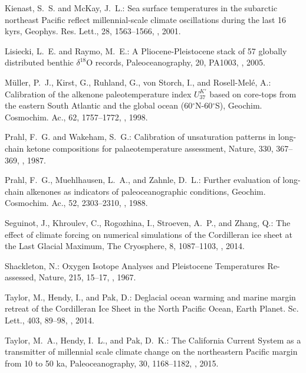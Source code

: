 \begin{thebibliography}{69}
Kienast, S.~S. and McKay, J.~L.: Sea surface temperatures in the subarctic
  northeast Pacific reflect millennial-scale climate oscillations during the
  last 16 kyrs, Geophys. Res. Lett., 28, 1563--1566,
  , 2001.

Lisiecki, L.~E. and Raymo, M.~E.: A Pliocene-Pleistocene stack of 57 globally
  distributed benthic $\delta^{18}$O records, Paleoceanography, 20, PA1003,
  , 2005.

M\"{u}ller, P.~J., Kirst, G., Ruhland, G., von Storch, I., and
  Rosell-Mel{\'{e}}, A.: Calibration of the alkenone paleotemperature index
  $U^{K'}_{37}$ based on core-tops from the eastern South Atlantic and the
  global ocean (60$^\circ$N-60$^\circ$S), Geochim. Cosmochim. Ac., 62,
  1757--1772, , 1998.

Prahl, F.~G. and Wakeham, S.~G.: Calibration of unsaturation patterns in
  long-chain ketone compositions for palaeotemperature assessment, Nature, 330,
  367--369, , 1987.

Prahl, F.~G., Muehlhausen, L.~A., and Zahnle, D.~L.: Further evaluation of
  long-chain alkenones as indicators of paleoceanographic conditions, Geochim.
  Cosmochim. Ac., 52, 2303--2310, , 1988.

Seguinot, J., Khroulev, C., Rogozhina, I., Stroeven, A.~P., and Zhang, Q.: The
  effect of climate forcing on numerical simulations of the {C}ordilleran ice
  sheet at the {L}ast {G}lacial {M}aximum, The Cryosphere, 8, 1087--1103,
  , 2014.

Shackleton, N.: Oxygen Isotope Analyses and Pleistocene Temperatures
  Re-assessed, Nature, 215, 15--17, , 1967.

Taylor, M., Hendy, I., and Pak, D.: Deglacial ocean warming and marine margin
  retreat of the Cordilleran Ice Sheet in the North Pacific Ocean, Earth
  Planet. Sc. Lett., 403, 89--98, , 2014.

Taylor, M.~A., Hendy, I.~L., and Pak, D.~K.: The California Current System as a
  transmitter of millennial scale climate change on the northeastern Pacific
  margin from 10 to 50 ka, Paleoceanography, 30, 1168--1182,
  , 2015.

\end{thebibliography}


